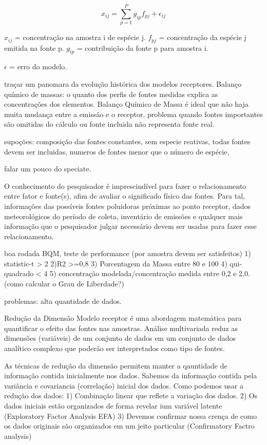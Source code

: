 \begin{equation}
  x_{ij} = \sum_{p=1}^{P} g_{ip}f_{pj} + \epsilon_{ij}
\end{equation} 

$x_{ij}$ = concentração na amostra i de espécie j.
$f_{pj}$ = concentração da espécie j emitida na fonte p. 
$g_{ip}$ = contribuição da fonte p para amostra i. 

$\epsilon$ = erro do modelo.

traçar um panomara da evolução histórica dos modelos receptores.
Balanço químico de massas: o quanto dos perfis de fontes medidas explica as concentrações dos elementos.
Balanço Químico de Massa
é ideal que não haja muita mudança entre a emissão e o receptor. problema quando fontes importantes são omitidas do cálculo ou fonte incluida não representa fonte real.

supoções: composição das fontes constantes, sem especie reativas, todas fontes devem ser incluidas, numeros de fontes menor que o número de espécie, 

falar um pouco do speciate. 

O conhecimento do pesquisador é imprescindível para fazer o relacionamento entre fator e fonte(s), afim de avaliar o significado físico das fontes. Para tal, informações das possíveis fontes poluidoras próximas ao ponto receptor, dados meteorológicos do período de coleta, inventário de emissões e qualquer mais informação que o pesquisador julgar necessário devem ser usadas para fazer esse relacionamento.

boa rodada BQM, teste de performance (por amostra devem ser satisfeitos)
1) statistic-t > 2
2)R2 >=0,8
3) Porcentagem da Massa entre 80 e 100 
4) qui-quadrado < 4
5) concentração modelada/concentração medida entre 0,2 e 2,0.  (como calcular o Grau de Liberdade?)

problemas: alta quantidade de dados.

Redução da Dimensão
Modelo receptor é uma abordagem matemática para quantificar o efeito das fontes nas amostras. 
Análise multivariada reduz as dimensões (variáveis) de um conjunto de dados em um conjunto de dados analítico complexo que poderão ser interpretados como tipo de fontes.


As técnicas de redução da dimensão permitem manter a qauntidade de informação contida inicialmente nos dados. Sabemos da informação contida pela variância e covariancia (correlação) inicial dos dados. Como podemos usar a redução dos dados: 
1) Combinação linear que reflete a variação dos dados. 
2) Os dados iniciais estão organizados de forma revelar ium variável latente (Exploratory Factor Analysis EFA)
3) Devemos confirmar nossa crença de como os dados originais são organizados em um jeito particular (Confirmatory Factro analysis)

